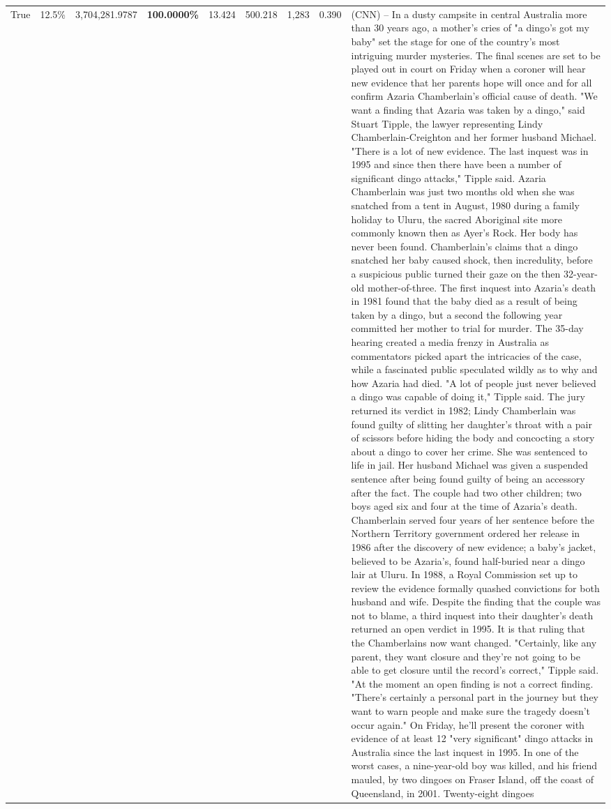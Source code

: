 \begin{table}[H]
\begin{tabular}{lllrlllll}
True & 12.5\% & 3,704,281.9787 & \bfseries \color{red} 100.0000\% & 13.424 & 500.218 & 1,283 & 0.390 & (CNN) -- In a dusty campsite in central Australia more than 30 years ago, a mother's cries of "a dingo's got my baby" set the stage for one of the country's most intriguing murder mysteries. The final scenes are set to be played out in court on Friday when a coroner will hear new evidence that her parents hope will once and for all confirm Azaria Chamberlain's official cause of death. "We want a finding that Azaria was taken by a dingo," said Stuart Tipple, the lawyer representing Lindy Chamberlain-Creighton and her former husband Michael. "There is a lot of new evidence. The last inquest was in 1995 and since then there have been a number of significant dingo attacks," Tipple said. Azaria Chamberlain was just two months old when she was snatched from a tent in August, 1980 during a family holiday to Uluru, the sacred Aboriginal site more commonly known then as Ayer's Rock. Her body has never been found. Chamberlain's claims that a dingo snatched her baby caused shock, then incredulity, before a suspicious public turned their gaze on the then 32-year-old mother-of-three. The first inquest into Azaria's death in 1981 found that the baby died as a result of being taken by a dingo, but a second the following year committed her mother to trial for murder. The 35-day hearing created a media frenzy in Australia as commentators picked apart the intricacies of the case, while a fascinated public speculated wildly as to why and how Azaria had died. "A lot of people just never believed a dingo was capable of doing it," Tipple said. The jury returned its verdict in 1982; Lindy Chamberlain was found guilty of slitting her daughter's throat with a pair of scissors before hiding the body and concocting a story about a dingo to cover her crime. She was sentenced to life in jail. Her husband Michael was given a suspended sentence after being found guilty of being an accessory after the fact. The couple had two other children; two boys aged six and four at the time of Azaria's death. Chamberlain served four years of her sentence before the Northern Territory government ordered her release in 1986 after the discovery of new evidence; a baby's jacket, believed to be Azaria's, found half-buried near a dingo lair at Uluru. In 1988, a Royal Commission set up to review the evidence formally quashed convictions for both husband and wife. Despite the finding that the couple was not to blame, a third inquest into their daughter's death returned an open verdict in 1995. It is that ruling that the Chamberlains now want changed. "Certainly, like any parent, they want closure and they're not going to be able to get closure until the record's correct," Tipple said. "At the moment an open finding is not a correct finding. "There's certainly a personal part in the journey but they want to warn people and make sure the tragedy doesn't occur again." On Friday, he'll present the coroner with evidence of at least 12 "very significant" dingo attacks in Australia since the last inquest in 1995. In one of the worst cases, a nine-year-old boy was killed, and his friend mauled, by two dingoes on Fraser Island, off the coast of Queensland, in 2001. Twenty-eight dingoes 
\end{tabular}
\end{table}
